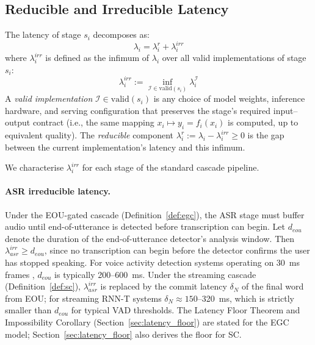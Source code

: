 \subsection{Reducible and Irreducible Latency}

\begin{definition}
\label{def:decomposition}
The latency of stage $s_i$ decomposes as:
\begin{equation}
  \lambda_i = \lambda_i^r + \lambda_i^{irr}
\end{equation}
where $\lambda_i^{irr}$ is defined as the infimum of $\lambda_i$ over all valid implementations of stage $s_i$:
\begin{equation}
  \lambda_i^{irr} := \inf_{\mathcal{I} \in \mathrm{valid}(s_i)} \lambda_i^{\mathcal{I}}
\end{equation}
A \emph{valid implementation} $\mathcal{I} \in \mathrm{valid}(s_i)$ is any choice of model weights, inference hardware, and serving configuration that preserves the stage's required input--output contract (i.e., the same mapping $x_i \mapsto y_i = f_i(x_i)$ is computed, up to equivalent quality).
The \emph{reducible} component $\lambda_i^r := \lambda_i - \lambda_i^{irr} \geq 0$ is the gap between the current implementation's latency and this infimum.
\end{definition}

We characterise $\lambda_i^{irr}$ for each stage of the standard cascade pipeline.

\paragraph{ASR irreducible latency.}
Under the EOU-gated cascade (Definition~\ref{def:egc}), the ASR stage must buffer audio
until end-of-utterance is detected before transcription can begin.
Let $d_{eou}$ denote the duration of the end-of-utterance detector's analysis window.
Then $\lambda_{asr}^{irr} \geq d_{eou}$, since no transcription can begin before the
detector confirms the user has stopped speaking.
For voice activity detection systems operating on 30~ms frames \citep{raux2008optimizing},
$d_{eou}$ is typically 200--600~ms.
Under the streaming cascade (Definition~\ref{def:sc}), $\lambda_{asr}^{irr}$ is replaced
by the commit latency $\delta_N$ of the final word from EOU;
for streaming RNN-T systems \citep{sainath2020streaming} $\delta_N \approx 150$--320~ms,
which is strictly smaller than $d_{eou}$ for typical VAD thresholds.
The Latency Floor Theorem and Impossibility Corollary (Section~\ref{sec:latency_floor})
are stated for the EGC model; Section~\ref{sec:latency_floor} also derives the floor for SC.


